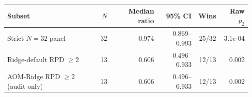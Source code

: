 \begin{tabularx}{\linewidth}{Xrrrrr}
\toprule
Subset & $N$ & Median ratio & 95\% CI & Wins & Raw $p_2$ \\
\midrule
Strict $N=32$ panel & 32 & 0.974 & 0.869--0.993 & 25/32 & 3.1e-04 \\
Ridge-default RPD $\geq 2$ & 13 & 0.606 & 0.496--0.933 & 12/13 & 0.002 \\
AOM-Ridge RPD $\geq 2$ (audit only) & 13 & 0.606 & 0.496--0.933 & 12/13 & 0.002 \\
\bottomrule
\end{tabularx}

